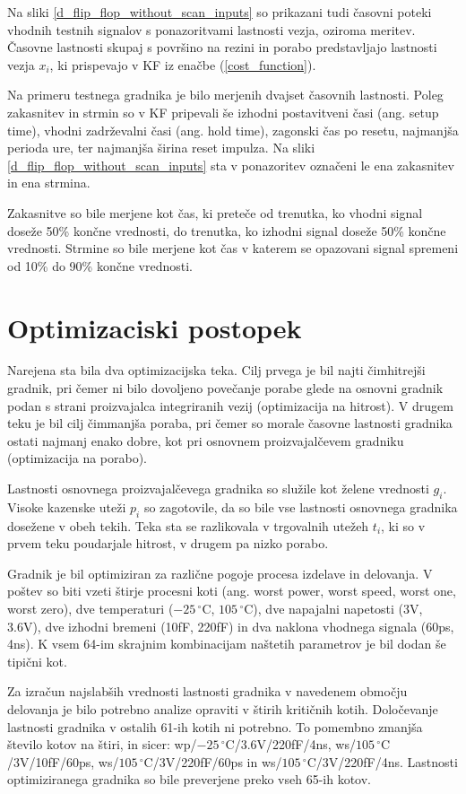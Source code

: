 \documentclass[journal,a4paper,twoside]{sty/IEEEtran}
\begin{document}
Na sliki \ref{d_flip_flop_without_scan_inputs} so prikazani tudi časovni poteki vhodnih testnih signalov s ponazoritvami lastnosti vezja, oziroma meritev. Časovne lastnosti skupaj s površino na rezini in porabo predstavljajo lastnosti vezja $x_i$, ki prispevajo v KF iz enačbe (\ref{cost_function}).

Na primeru testnega gradnika je bilo merjenih dvajset časovnih lastnosti. Poleg zakasnitev in strmin so v KF pripevali še izhodni postavitveni časi (ang. setup time), vhodni zadrževalni časi (ang. hold time), zagonski čas po resetu, najmanjša perioda ure, ter najmanjša širina reset impulza. Na sliki \ref{d_flip_flop_without_scan_inputs} sta v ponazoritev označeni le ena zakasnitev in ena strmina.

Zakasnitve so bile merjene kot čas, ki preteče od trenutka, ko vhodni signal doseže 50\% končne vrednosti, do trenutka, ko izhodni signal doseže 50\% končne vrednosti. Strmine so bile merjene kot čas v katerem se opazovani signal spremeni od 10\% do 90\% končne vrednosti.

\section{Optimizaciski postopek}
Narejena sta bila dva optimizacijska teka. Cilj prvega je bil najti čimhitrejši gradnik, pri čemer ni bilo dovoljeno povečanje porabe glede na osnovni gradnik podan s strani proizvajalca integriranih vezij (optimizacija na hitrost). V drugem teku je bil cilj čimmanjša poraba, pri čemer so morale časovne lastnosti gradnika ostati najmanj enako dobre, kot pri osnovnem proizvajalčevem gradniku (optimizacija na porabo).

Lastnosti osnovnega proizvajalčevega gradnika so služile kot želene vrednosti $g_i$. Visoke kazenske uteži $p_i$ so zagotovile, da so bile vse lastnosti osnovnega gradnika dosežene v obeh tekih. Teka sta se razlikovala v trgovalnih utežeh $t_i$, ki so v prvem teku poudarjale hitrost, v drugem pa nizko porabo.

Gradnik je bil optimiziran za različne pogoje procesa izdelave in delovanja. V poštev so biti vzeti štirje procesni koti (ang. worst power, worst speed, worst one, worst zero), dve temperaturi ($-25\,^{\circ}\mathrm{C}$, $105\,^{\circ}\mathrm{C}$), dve napajalni napetosti (3V, 3.6V), dve izhodni bremeni (10fF, 220fF) in dva naklona vhodnega signala (60ps, 4ns). K vsem 64-im skrajnim kombinacijam naštetih parametrov je bil dodan še tipični kot.

Za izračun najslabših vrednosti lastnosti gradnika v navedenem območju delovanja je bilo potrebno analize opraviti v štirih kritičnih kotih. Določevanje lastnosti gradnika v ostalih 61-ih kotih ni potrebno. To pomembno zmanjša število kotov na štiri, in sicer: wp/$-25\,^{\circ}\mathrm{C}$/3.6V/220fF/4ns, ws/$105\,^{\circ}\mathrm{C}$/3V/10fF/60ps, ws/$105\,^{\circ}\mathrm{C}$/3V/220fF/60ps in ws/$105\,^{\circ}\mathrm{C}$/3V/220fF/4ns. Lastnosti optimiziranega gradnika so bile preverjene preko vseh 65-ih kotov.
\end{document}
